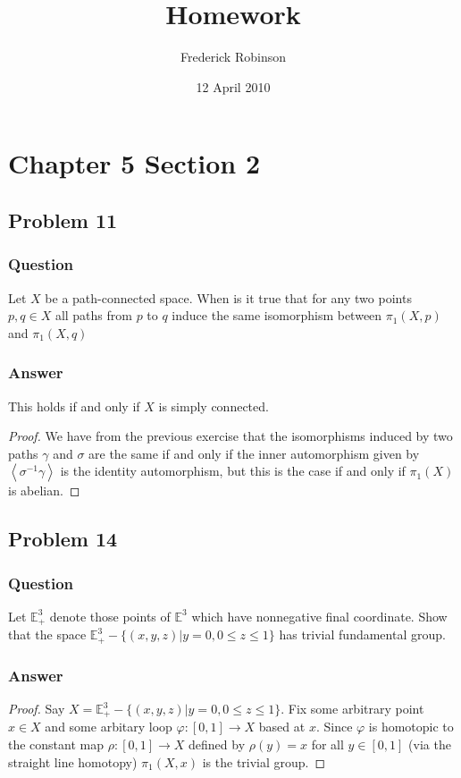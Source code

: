 \documentclass[10pt]{article}
\title{Homework}
\author{Frederick Robinson}
\date{12 April 2010}
\begin{document}

   \maketitle

\section{Chapter 5 Section 2}

\subsection{Problem 11}
\subsubsection{Question}
Let $X$ be a path-connected space. When is it true that for any two points $p,q \in X$ all paths from $p$ to $q$ induce the same isomorphism between $\pi_1(X,p)$ and $\pi_1(X,q)$
\subsubsection{Answer}
This holds if and only if $X$ is simply connected.
\begin{proof}
We have from the previous exercise that the isomorphisms induced by two paths $\gamma$ and $\sigma$ are the same if and only if the inner automorphism given by $\left<\sigma^{-1} \gamma\right>$ is the identity automorphism, but this is the case if and only if $\pi_1(X)$ is abelian. 
\end{proof}
\subsection{Problem 14}
\subsubsection{Question}
Let $\mathbb{E}^3_+$ denote those points of $\mathbb{E}^3$ which have nonnegative final coordinate. Show that the space $\mathbb{E}^3_+-\{(x,y,z)|y=0,0\leq z \leq 1\}$ has trivial fundamental group.
\subsubsection{Answer}
\begin{proof}
Say $X=\mathbb{E}^3_+-\{(x,y,z)|y=0,0\leq z \leq 1\}$. Fix some arbitrary point $x \in X$ and some arbitary loop $\varphi:[0,1]\to X$ based at $x$. Since $\varphi$ is homotopic to the constant map $\rho : [0,1]\to X$ defined by $\rho(y)=x$ for all $y \in [0,1]$ (via the straight line homotopy) $\pi_1(X,x)$ is the trivial group.
\end{proof}
\end{document}
